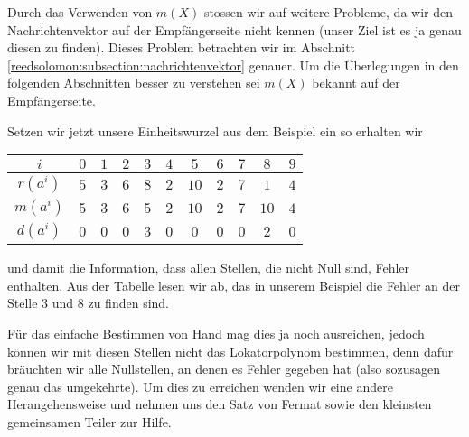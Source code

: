 Durch das Verwenden von $m(X)$ stossen wir auf weitere Probleme, da wir den Nachrichtenvektor auf der Empfängerseite nicht kennen (unser Ziel ist es ja genau diesen zu finden). Dieses Problem betrachten wir im Abschnitt \ref{reedsolomon:subsection:nachrichtenvektor} genauer. Um die Überlegungen in den folgenden Abschnitten besser zu verstehen sei $m(X)$ bekannt auf der Empfängerseite.


Setzen wir jetzt unsere Einheitswurzel aus dem Beispiel ein so erhalten wir
\begin{center}
\begin{tabular}{c c c c c c c c c c c}
	\hline
	$i$& $0$& $1$& $2$& $3$& $4$& $5$& $6$& $7$& $8$& $9$\\
	\hline
	$r(a^{i})$& $5$& $3$& $6$& $8$& $2$& $10$& $2$& $7$& $1$& $4$\\
	$m(a^{i})$& $5$& $3$& $6$& $5$& $2$& $10$& $2$& $7$& $10$& $4$\\
	$d(a^{i})$& $0$& $0$& $0$& $3$& $0$& $0$& $0$& $0$& $2$& $0$\\
	\hline
\end{tabular}
\end{center}
und damit die Information, dass allen Stellen, die nicht Null sind, Fehler enthalten. 
Aus der Tabelle lesen wir ab, das in unserem Beispiel die Fehler an der Stelle $3$ und $8$ zu finden sind.

Für das einfache Bestimmen von Hand mag dies ja noch ausreichen, jedoch können wir mit diesen Stellen nicht das Lokatorpolynom bestimmen, denn dafür bräuchten wir alle Nullstellen, an denen es Fehler gegeben hat (also sozusagen genau das umgekehrte). Um dies zu erreichen wenden wir eine andere Herangehensweise und nehmen uns den Satz von Fermat sowie den kleinsten gemeinsamen Teiler zur Hilfe.

